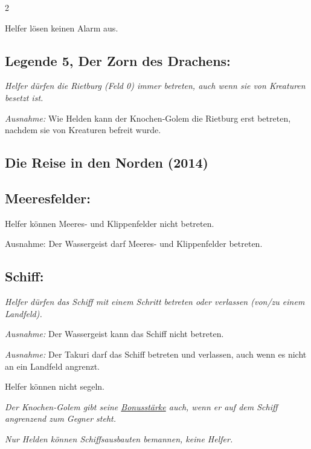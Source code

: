 \documentclass[10pt, a4paper, oneside]{book}
\newcommand{\fan}[1]{\textit{#1}}
\begin{document}
\begin{multicols*}{2}
\begin{bgcolor}
Helfer lösen keinen Alarm aus.
\supercite{nh-begleitheft}


\subsection{Legende 5, Der Zorn des Drachens:}

\fan{Helfer dürfen die Rietburg (Feld 0) immer betreten, auch wenn sie von Kreaturen besetzt ist.}
\supercite{mh-begleitheft}

\fan{Ausnahme:} Wie Helden kann der Knochen-Golem die Rietburg erst betreten, nachdem sie von Kreaturen befreit wurde.
\supercite{dh-faq}


\end{bgcolor}


\columnbreak


\begin{bgcolor}
\section{Die Reise in den Norden (2014)}

\subsection{Meeresfelder:}

Helfer können Meeres- und Klippenfelder nicht betreten.

Ausnahme: Der Wassergeist darf Meeres- und Klippenfelder betreten.
\supercite{10815,dridn-begleitheft,dridn-faq} 


\subsection{Schiff:}

\fan{Helfer dürfen das Schiff mit einem Schritt betreten oder verlassen (von/zu einem Landfeld).}
\supercite{mh-begleitheft}

\fan{Ausnahme:} Der Wassergeist kann das Schiff nicht betreten.
\supercite{dridn-begleitheft}

\fan{Ausnahme:} Der Takuri darf das Schiff betreten und verlassen, auch wenn es nicht an ein Landfeld angrenzt.
\supercite{88939}

Helfer können nicht segeln.
\supercite{32649}

\fan{Der Knochen-Golem gibt seine \hyperref[bonusstaerke]{Bonusstärke} auch, wenn er auf dem Schiff angrenzend zum Gegner steht.}

\fan{Nur Helden können Schiffsausbauten bemannen, keine Helfer.}



\end{bgcolor}
\end{multicols*}
\end{document}
